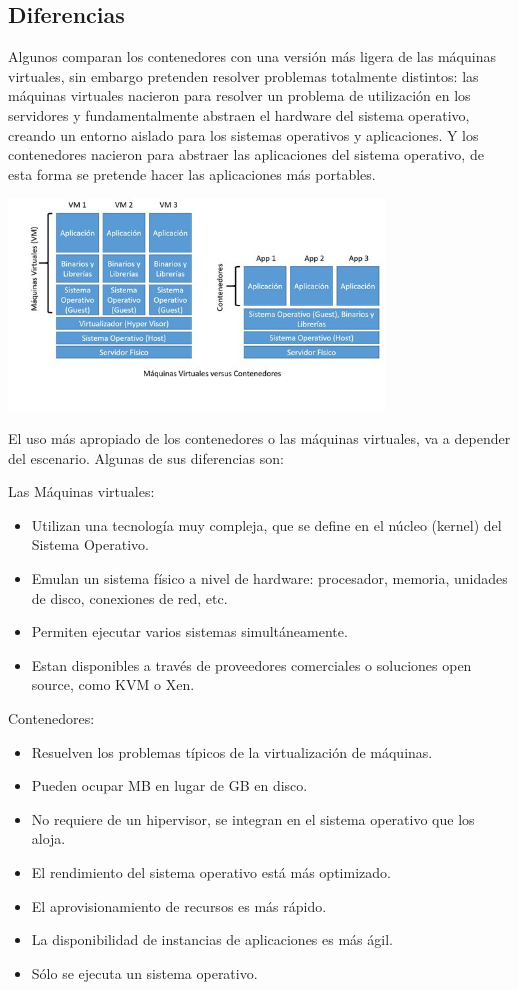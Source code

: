\documentclass[%
 reprint,
 amsmath,amssymb,
 aps,
]{revtex4-1}
\begin{document}
\subsection{Diferencias}
	\par Algunos comparan los contenedores con una versión más ligera de las máquinas virtuales, sin embargo pretenden resolver problemas totalmente distintos:
 las máquinas virtuales nacieron para resolver un problema de utilización en los servidores y fundamentalmente abstraen el hardware del sistema operativo, creando un entorno aislado para los sistemas operativos y aplicaciones. 
Y los contenedores nacieron para abstraer las aplicaciones del sistema operativo, de esta forma se pretende hacer las aplicaciones más portables.
\begin{center}
\includegraphics[width=10cm]{./Imagenes/mc}
\end{center}
\par El uso más apropiado de los contenedores o las máquinas virtuales, va a depender del escenario. Algunas de sus diferencias son:\cite{miguel}
\par Las Máquinas virtuales:
	\begin{itemize}
		\item Utilizan una tecnología muy compleja, que se define en el núcleo (kernel) del Sistema Operativo.
		\item Emulan un sistema físico a nivel de hardware: procesador, memoria, unidades de disco, conexiones de red, etc.
		\item Permiten ejecutar varios sistemas simultáneamente.
		\item Estan disponibles a través de proveedores comerciales o soluciones open source, como KVM o Xen.
	\end{itemize}
\par Contenedores:
	\begin{itemize}
		\item Resuelven  los problemas típicos de la virtualización de máquinas.
		\item Pueden ocupar MB en lugar de GB en disco.
		\item No requiere de un hipervisor, se integran en el sistema operativo que los aloja.
		\item El rendimiento del sistema operativo está más optimizado.
		\item El aprovisionamiento de recursos es más rápido.
		\item La disponibilidad de instancias de aplicaciones es más ágil.
		\item Sólo se ejecuta un sistema operativo. \cite{gunnar}
	\end{itemize}
\end{document}
